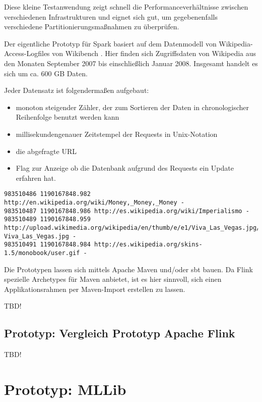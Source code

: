 Diese kleine Testanwendung zeigt schnell die Performanceverhältnisse zwischen verschiedenen Infrastrukturen und eignet sich gut, um gegebenenfalls verschiedene Partitionierungsmaßnahmen zu überprüfen.  

Der eigentliche Prototyp für Spark basiert auf dem Datenmodell von Wikipedia-Access-Logfiles von Wikibench . Hier finden sich Zugriffsdaten von Wikipedia aus den Monaten September 2007 bis einschließlich Januar 2008. Insgesamt handelt es sich um ca. 600 GB Daten. 

Jeder Datensatz ist folgendermaßen aufgebaut:

\begin{itemize}
\item monoton steigender Zähler, der zum Sortieren der Daten in chronologischer Reihenfolge benutzt werden kann
\item millisekundengenauer Zeitstempel der Requests in Unix-Notation
\item die abgefragte URL
\item Flag zur Anzeige ob die Datenbank aufgrund des Requests ein Update erfahren hat. 
\end{itemize}

\begin{lstlisting}[label=vwikilogs,caption=Beispieleinträge der Wikipedia Access Logs.]
983510486 1190167848.982 http://en.wikipedia.org/wiki/Money,_Money,_Money -
983510487 1190167848.986 http://es.wikipedia.org/wiki/Imperialismo -
983510489 1190167848.959 http://upload.wikimedia.org/wikipedia/en/thumb/e/e1/Viva_Las_Vegas.jpg/180px-Viva_Las_Vegas.jpg -
983510491 1190167848.984 http://es.wikipedia.org/skins-1.5/monobook/user.gif -
\end{lstlisting}

Die Prototypen lassen sich mittels Apache Maven  und/oder sbt  bauen. Da Flink spezielle Archetypes für Maven anbietet, ist es hier sinnvoll, sich einen Applikationsrahmen per Maven-Import erstellen zu lassen.  



TBD!

\subsection{Prototyp: Vergleich Prototyp Apache Flink }
\label{section:vergleich apache flink}

TBD!

\section{Prototyp: MLLib }
\label{section:prototyp mllib}

